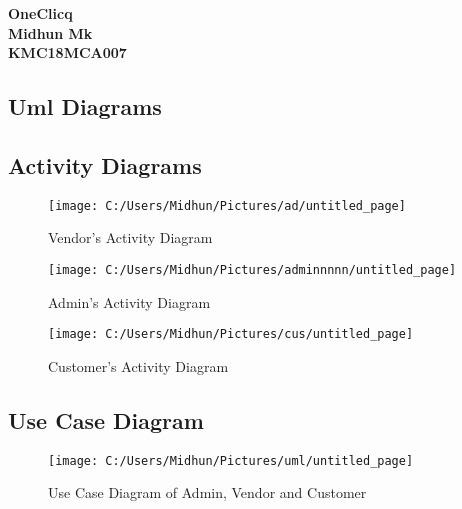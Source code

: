 \documentclass{beamer}
\begin{document}
\begin{frame}
		\begin{center}
			
	
{\bfseries \Huge OneClicq}\\

{\bfseries \LARGE Midhun Mk}\\
{\bfseries KMC18MCA007}
	\end{center}
\end{frame}

\begin{frame}
\section{Uml Diagrams}
\subsection{Activity Diagrams}

\begin{figure}[bph]
	\centering
	\texttt{[image: C:/Users/Midhun/Pictures/ad/untitled\_page]}
	\caption{Vendor's Activity Diagram }
	\label{fig:untitledpage}
\end{figure}
\end{frame}

\begin{frame}

\begin{figure}[bph]
	\centering
	\texttt{[image: C:/Users/Midhun/Pictures/adminnnnn/untitled\_page]}
	\caption{Admin's Activity Diagram}
	\label{fig:untitledpage}
\end{figure}
\end{frame}

\begin{frame}

\begin{figure}[bph]
	\centering
	\texttt{[image: C:/Users/Midhun/Pictures/cus/untitled\_page]}
	\caption{Customer's Activity Diagram}
	\label{fig:untitledpage}
\end{figure}
\end{frame}



\begin{frame}
\subsection{Use Case Diagram}
\begin{figure}[bph]
	\centering
	\texttt{[image: C:/Users/Midhun/Pictures/uml/untitled\_page]}
	\caption{Use Case Diagram of Admin, Vendor and Customer}
	\label{fig:untitledpage}
\end{figure}

\pagebreak
	
\end{frame}
\end{document}
